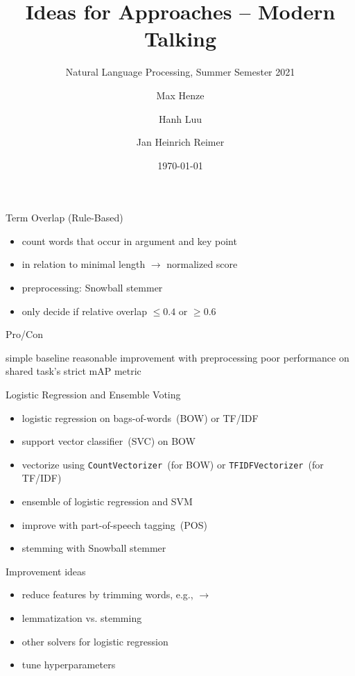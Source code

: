 \documentclass[english,handout]{mlutalk}
\title{Ideas for Approaches -- Modern Talking}
\subtitle{Natural Language Processing, Summer Semester 2021}
\author{Max Henze \and Hanh Luu \and Jan Heinrich Reimer}
\institute{Martin Luther University Halle-Wittenberg}
\date{\today}
\newcommand{\TFIDF}{\mbox{TF/IDF}\xspace}
\newcommand{\mAP}{\mbox{mAP}\xspace}
\begin{document}
\titleframe

\begin{frame}{Term Overlap (Rule-Based)}
  \begin{itemize}
    \item count words that occur in argument and key point
    \item in relation to minimal length \(\to\) normalized score
    \item preprocessing: Snowball stemmer~\cite{Porter1980}
    \item only decide if relative overlap \(\leq 0.4\) or \(\geq 0.6\)
  \end{itemize}

  \begin{block}{Pro/Con}
    \begin{itemize}
      \pro simple baseline
      \pro reasonable improvement with preprocessing
      \con poor performance on shared task's strict \mAP metric
    \end{itemize}
  \end{block}
\end{frame}

\begin{frame}[allowframebreaks]{Logistic Regression and Ensemble Voting}

  \begin{itemize}
    \item logistic regression on bags-of-words~(BOW) or \TFIDF \\
    \item support vector classifier~(SVC) on BOW
    \item vectorize using \lstinline{CountVectorizer}~(for BOW) or \lstinline{TFIDFVectorizer}~(for \TFIDF)
    \item ensemble of logistic regression and SVM
    \item improve with part-of-speech tagging~(POS) %
    \item stemming with Snowball stemmer~\cite{Porter1980}
  \end{itemize}

  \begin{block}{Improvement ideas}
  \begin{itemize}
      \item reduce features by trimming words, e.g.,  \(\to\) 
      \item lemmatization vs. stemming
      \item other solvers for logistic regression
      \item tune hyperparameters
  \end{itemize}
  \end{block}
\end{frame}
\end{document}
